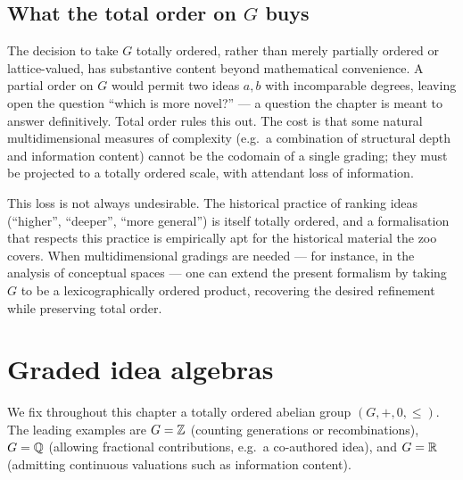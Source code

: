 \subsection*{What the total order on $G$ buys}

The decision to take $G$ totally ordered, rather than merely partially
ordered or lattice-valued, has substantive content beyond
mathematical convenience. A partial order on $G$ would permit two
ideas $a, b$ with incomparable degrees, leaving open the question
``which is more novel?'' --- a question the chapter is meant to
answer definitively. Total order rules this out. The cost is that
some natural multidimensional measures of complexity (e.g.\ a
combination of structural depth and information content) cannot be
the codomain of a single grading; they must be projected to a
totally ordered scale, with attendant loss of information.

This loss is not always undesirable. The historical practice of
ranking ideas (``higher'', ``deeper'', ``more general'') is itself
totally ordered, and a formalisation that respects this practice is
empirically apt for the historical material the zoo covers. When
multidimensional gradings are needed --- for instance, in the
analysis of conceptual spaces \cite{Gardenfors2000} --- one can
extend the present formalism by taking $G$ to be a lexicographically
ordered product, recovering the desired refinement while preserving
total order.

\section{Graded idea algebras}\label{sec:graded-axioms}

We fix throughout this chapter a totally ordered abelian group
$(G,+,0,\le)$. The leading examples are $G = \mathbb{Z}$ (counting generations
or recombinations), $G = \mathbb{Q}$ (allowing fractional contributions, e.g.\ a
co-authored idea), and $G = \mathbb{R}$ (admitting continuous valuations such
as information content).

